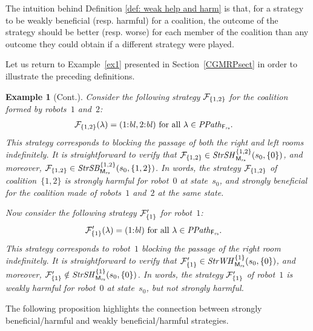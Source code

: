 \documentclass{article}
\newtheorem{example}{Example}
\begin{document}
The intuition behind Definition \ref{def: weak help and harm} is that, for a strategy to be weakly beneficial (resp. harmful) for a coalition, the outcome of the strategy should be better (resp. worse) for each member of the coalition than any outcome they could obtain if a different strategy were played.


Let us return to Example~\ref{ex1} presented in Section~\ref{CGMRPsect} in order to illustrate the preceding definitions.
\begin{example}[Cont.]\label{exa:cont1}
Consider the following strategy $\mathcal{F}_{\{1,2\}}$ for the coalition formed by robots~$1$ and~$2$:
\begin{align*}
 &  \mathcal{F}_{\{1,2\}}(\lambda)=
(1{:}\mathit{bl}, 2{:}\mathit{bl}) 
 \text{ for all }\lambda \in \mathit{PPath}_{\mathsf{F}_{\mathit{rs}}}.
\end{align*}
This strategy corresponds to blocking the passage of  both the right and left rooms indefinitely.  
It is straightforward to verify that
$\mathcal{F}_{\{1,2\}} \in
\mathit{StrSH}_{\mathsf{M}_{\mathit{rs}}}^{\{1,2\}} (s_0,\{0\})$, 
and moreover,
$\mathcal{F}_{\{1,2\}} \in
\mathit{StrSB}_{\mathsf{M}_{\mathit{rs}}}^{\{1,2\}} (s_0,\{1,2\})$. 
In words, the strategy $\mathcal{F}_{\{1,2\}}$ of coalition~$\{1,2\}$ 
is strongly harmful for robot~$0$ at state~$s_0$, 
and strongly beneficial for the coalition made of robots~$1$ and~$2$ at the same state.

Now consider the following strategy $\mathcal{F}_{\{1\}}'$ for robot~$1$:
\begin{align*}
 &  \mathcal{F}_{\{1\}}'(\lambda)=
(1{:}\mathit{bl}) 
 \text{ for all }\lambda \in \mathit{PPath}_{\mathsf{F}_{\mathit{rs}}}.
\end{align*}
This strategy corresponds to robot~$1$ blocking the passage of the right room indefinitely.  
It is straightforward to verify that
$\mathcal{F}_{\{1\}}' \in
\mathit{StrWH}_{\mathsf{M}_{\mathit{rs}}}^{\{1\}} (s_0,\{0\})$, 
and moreover,
$\mathcal{F}_{\{1\}}' \notin
\mathit{StrSH}_{\mathsf{M}_{\mathit{rs}}}^{\{1\}} (s_0,\{0\})$. 
In words, the strategy $\mathcal{F}_{\{1\}}'$ of robot~$1$ 
is weakly harmful for robot~$0$ at state~$s_0$, 
but not strongly harmful. 



\end{example}

The following proposition highlights the connection between strongly beneficial/harmful and weakly beneficial/harmful strategies. 
\end{document}
